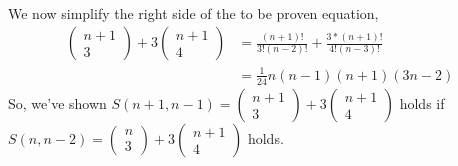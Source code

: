 \documentclass[UTF8]{article}
\begin{document}
\begin{enumerate}[(a)]
\begin{enumerate}[1]
\begin{equation}
\begin{aligned}
                    \nonumber
                    \end{aligned}
                \end{equation}
                We now simplify the right side of the to be proven equation, 
                \begin{equation}
                    \begin{aligned}
                    \begin{pmatrix} n + 1 \\ 3 \end{pmatrix} + 3 \begin{pmatrix} n + 1 \\ 4 \end{pmatrix} &= \frac{(n + 1)!}{3!(n -2)!} + \frac{3 * (n + 1)!}{4!(n - 3)!}\\
                    &= \frac{1}{24}n(n - 1)(n + 1)(3n - 2)
                    \nonumber
                    \end{aligned}
                \end{equation}
                So, we’ve shown $ S(n + 1, n - 1) = \begin{pmatrix} n + 1 \\ 3 \end{pmatrix} + 3 \begin{pmatrix} n + 1 \\ 4 \end{pmatrix} $ holds if $S(n , n - 2) = \begin{pmatrix} n \\ 3 \end{pmatrix} + 3 \begin{pmatrix} n + 1 \\ 4 \end{pmatrix}$
holds.
        \end{enumerate}
\end{enumerate}
\end{document}
